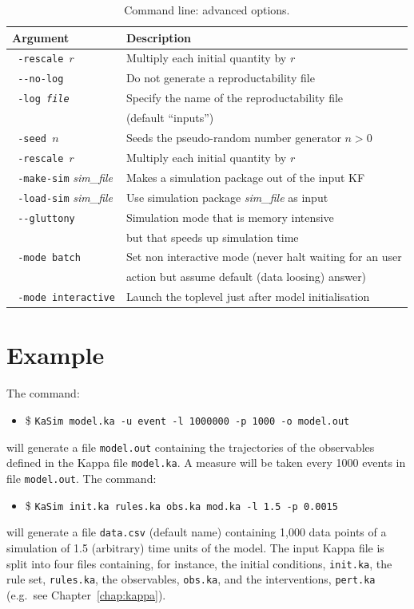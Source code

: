 \documentclass[11pt]{book}
\def\ttt#1{\texttt{#1}}
\def\eg{e.g.~}
\def\ITE#1{\begin{itemize}#1\end{itemize}}
\def\dd{-\hspace{0.001cm}-}
\begin{document}
\begin{table}[h!]
\caption{Command line: advanced options.}
\centering
\begin{tabular}{|l|l|}
\hline
Argument & Description \\ \hline
\ttt{ -rescale $r$} & Multiply each initial quantity by $r$ \\
\ttt{ \dd no-log} & Do not generate a reproductability file \\
\ttt{ -log \textit{file}} & Specify the name of the reproductability file \\
& (default ``inputs'') \\
\ttt{ -seed $n$} & Seeds the pseudo-random number generator $n>0$ \\
\ttt{ -rescale $r$} & Multiply each initial quantity by $r$ \\
\ttt{ -make-sim} \textit{sim\_file} & Makes a simulation package out of the input KF\index{Kappa file} \\
\ttt{ -load-sim} \textit{sim\_file} & Use simulation package \textit{sim\_file} as input\\
\ttt{ \dd gluttony} & Simulation mode that is memory intensive \\ & but that speeds up simulation time\\
\ttt{ -mode batch} & Set non interactive mode (never halt waiting for an user\\
& action but assume default (data loosing) answer)\\
\ttt{ -mode interactive} & Launch the toplevel just after model initialisation\\
\hline
\end{tabular}
\label{tab:add-options}
\end{table}%
%

\section{Example}
The command:
\ITE{
\item[\$] \ttt{KaSim model.ka -u event -l 1000000 -p 1000 -o model.out}
}
will generate a file \ttt{model.out} containing the trajectories of the observables defined in the Kappa file \ttt{model.ka}. A measure will be taken every 1000 events in file \ttt{model.out}. The command:
\ITE{
\item[\$] \ttt{KaSim init.ka rules.ka obs.ka mod.ka -l 1.5 -p 0.0015}
}
will generate a file \ttt{data.csv} (default name) containing 1,000 data points of a simulation of 1.5 (arbitrary) time units of the model. The input Kappa file is split into four files containing, for instance, the initial conditions, \ttt{init.ka}, the rule set, \ttt{rules.ka}, the observables, \ttt{obs.ka}, and the interventions, \ttt{pert.ka} ({\eg}see Chapter~\ref{chap:kappa}). %
\end{document}
